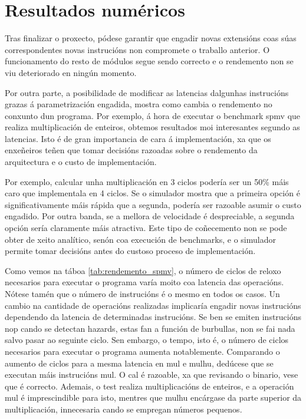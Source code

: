 \section{Resultados numéricos}\label{chap:resultados}
Tras finalizar o proxecto, pódese garantir que engadir novas extensións coas súas correspondentes novas instrucións non compromete o traballo anterior. O funcionamento do resto de módulos segue sendo correcto e o rendemento non se viu deteriorado en ningún momento.

Por outra parte, a posibilidade de modificar as latencias dalgunhas instrucións grazas á parametrización engadida, mostra como cambia o rendemento no conxunto dun programa. Por exemplo, á hora de executar o benchmark \acrshort{spmv} que realiza multiplicación de enteiros, obtemos resultados moi interesantes segundo as latencias. Isto é de gran importancia de cara á implementación, xa que os enxeñeiros teñen que tomar decisións razoadas sobre o rendemento da arquitectura e o custo de implementación. 

Por exemplo, calcular unha multiplicación en 3 ciclos podería ser un 50\% máis caro que implementala en 4 ciclos. Se o simulador mostra que a primeira opción é significativamente máis rápida que a segunda, podería ser razoable asumir o custo engadido. Por outra banda, se a mellora de velocidade é despreciable, a segunda opción sería claramente máis atractiva. Este tipo de coñecemento non se pode obter de xeito analítico, senón coa execución de benchmarks, e o simulador permite tomar decisións antes do custoso proceso de implementación. 

Como vemos na táboa \ref{tab:rendemento_spmv}, o número de ciclos de reloxo necesarios para executar o programa varía moito coa latencia das operacións. Nótese tamén que o número de instrucións é o mesmo en todos os casos. Un cambio na cantidade de operacións realizadas implicaría engadir novas instrucións dependendo da latencia de determinadas instrucións. Se ben se emiten instrucións \acrshort{nop} cando se detectan hazards, estas fan a función de burbullas, non se fai nada salvo pasar ao seguinte ciclo. Sen embargo, o tempo, isto é, o número de ciclos necesarios para executar o programa aumenta notablemente. Comparando o aumento de ciclos para a mesma latencia en mul e mulhu, dedúcese que se executan máis instrucións mul. O cal é razoable, xa que revisando o binario, vese que é correcto. Ademais, o test realiza multiplicacións de enteiros, e a operación mul é imprescindible para isto, mentres que mulhu encárgase da parte superior da multiplicación, innecesaria cando se empregan números pequenos.

